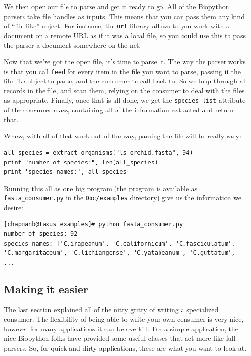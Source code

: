 \documentclass{report}
\begin{document}
We then open our file to parse and get it ready to go. All of the Biopython parsers take file handles as inputs. This means that you can pass them any kind of ``file-like'' object. For instance, the \verb|url| library allows to you work with a document on a remote URL as if it was a local file, so you could use this to pass the parser a document somewhere on the net.


Now that we've got the open file, it's time to parse it. The way the parser works is that you call \verb|feed| for every item in the file you want to parse, passing it the file-like object to parse, and the consumer to call back to. So we loop through all records in the file, and scan them, relying on the consumer to deal with the files as appropriate. Finally, once that is all done, we get the \verb|species_list| attribute of the consumer class, containing all of the information extracted and return that.


Whew, with all of that work out of the way, parsing the file will be really easy:

\begin{verbatim}
all_species = extract_organisms("ls_orchid.fasta", 94)
print "number of species:", len(all_species)
print 'species names:', all_species
\end{verbatim}

Running this all as one big program (the program is available as \verb|fasta_consumer.py| in the \verb|Doc/examples| directory) give us the information we desire:

\begin{verbatim}
[chapmanb@taxus examples]# python fasta_consumer.py
number of species: 92
species names: ['C.irapeanum', 'C.californicum', 'C.fasciculatum', 
'C.margaritaceum', 'C.lichiangense', 'C.yatabeanum', 'C.guttatum',
...
\end{verbatim}

\subsection{Making it easier}
\label{sec:fasta-parsing}

The last section explained all of the nitty gritty of writing a specialized consumer. The flexibility of being able to write your own consumer is very nice, however for many applications it can be overkill. For a simple application, the nice Biopython folks have provided some useful classes that act more like full parsers. So, for quick and dirty applications, these are what you want to look at. 
\end{document}
